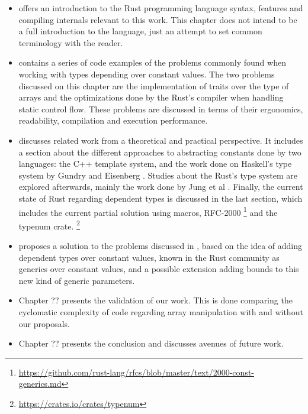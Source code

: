 \begin{itemize}
    \item {} offers an introduction to the Rust
        programming language syntax, features and compiling internals relevant
        to this work. This chapter does not intend to be a full introduction to
        the language, just an attempt to set common terminology with the
        reader.
    \item {} contains a series of code examples of the
        problems commonly found when working with types depending over constant
        values. The two problems discussed on this chapter are the
        implementation of traits over the type of arrays and the optimizations
        done by the Rust's compiler when handling static control flow. These
        problems are discussed in terms of their ergonomics, readability,
        compilation and execution performance.
    \item {} discusses related work from a theoretical
        and practical perspective. It includes a section about the
        different approaches to abstracting constants done by
        two languages: the C++ template system, and the work done on Haskell's type
        system by Gundry \cite{gundry} and Eisenberg \cite{eisenberg}. Studies
        about the Rust's type system are explored afterwards, mainly the work
        done by Jung et al \cite{ralf}. Finally, the current state of Rust
        regarding dependent types is discussed in the last section, which
        includes the current partial solution using macros, RFC-2000
        \footnote{\url{https://github.com/rust-lang/rfcs/blob/master/text/2000-const-generics.md}}
        and the typenum crate.
        \footnote{\url{https://crates.io/crates/typenum}}
    \item {} proposes a solution to the problems discussed in
        , based on the idea of adding dependent types
        over constant values, known in the Rust community as generics over
        constant values, and a possible extension adding bounds to this new
        kind of generic parameters.

    \item Chapter ?? presents the validation of our work. This is done
        comparing the cyclomatic complexity of code regarding array
        manipulation with and without our proposals.

    \item Chapter ?? presents the conclusion and discusses avenues of future
        work.
\end{itemize}
